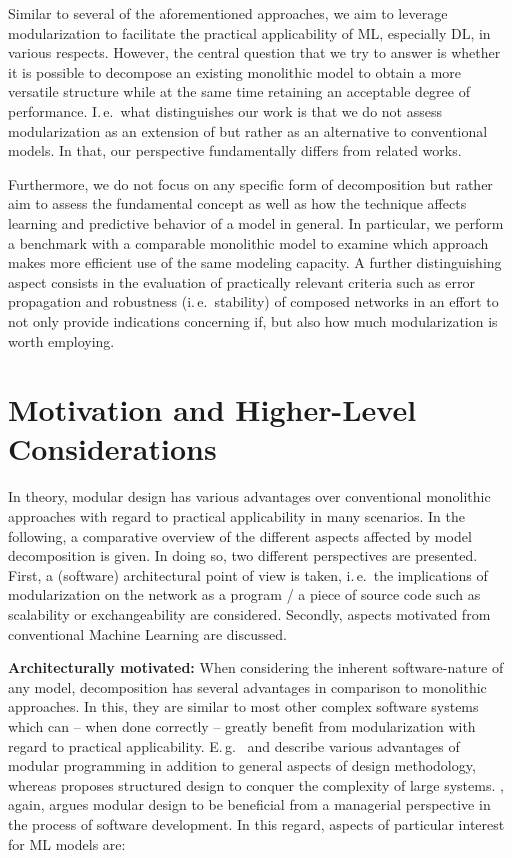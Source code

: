 Similar to several of the aforementioned approaches, we aim to leverage modularization to facilitate the practical applicability of ML, especially DL, in various respects. However, the central question that we try to answer is whether it is possible to decompose an existing monolithic model to obtain a more versatile structure while at the same time retaining an acceptable degree of performance. I.\,e.\ what distinguishes our work is that we do not assess modularization as an extension of but rather as an alternative to conventional models. In that, our perspective fundamentally differs from related works.

Furthermore, we do not focus on any specific form of decomposition but rather aim to assess the fundamental concept as well as how the technique affects learning and predictive behavior of a model in general. In particular, we perform a benchmark with a comparable monolithic model to examine which approach makes more efficient use of the same modeling capacity. A further distinguishing aspect consists in the evaluation of practically relevant criteria such as error propagation and robustness (i.\,e.\ stability) of composed networks in an effort to not only provide indications concerning if, but also how much modularization is worth employing.

\cleardoublepage

\section{Motivation and Higher-Level Considerations%
         \label{sec:motivation}}
         
In theory, modular design has various advantages over conventional monolithic approaches with regard to practical applicability in many scenarios. In the following, a comparative overview of the different aspects affected by model decomposition is given. In doing so, two different perspectives are presented. First, a (software) architectural point of view is taken, i.\,e.\ the implications of modularization on the network as a program / a piece of source code such as scalability or exchangeability are considered. Secondly, aspects motivated from conventional Machine Learning are discussed.

\textbf{Architecturally motivated:} When considering the inherent software-nature of any model, decomposition has several advantages in comparison to monolithic approaches. In this, they are similar to most other complex software systems which can -- when done correctly -- greatly benefit from modularization with regard to practical applicability. E.\,g.\ \cite{Parnas1971-yk} and \cite{Parnas1971-xy} describe various advantages of modular programming in addition to general aspects of design methodology, whereas \cite{Page-Jones1996-vv} proposes structured design to conquer the complexity of large systems. \cite{Brooks1995-wm}, again, argues modular design to be beneficial from a managerial perspective in the process of software development. In this regard, aspects of particular interest for ML models are:

